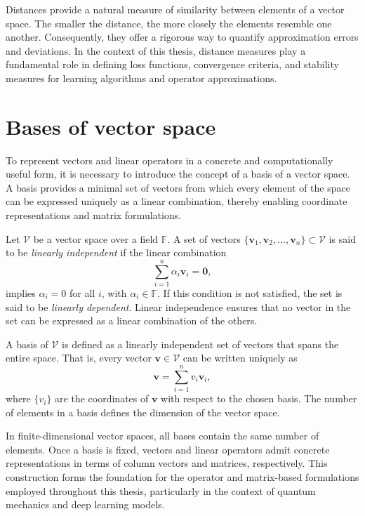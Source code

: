 Distances provide a natural measure of similarity between elements of a vector space. The smaller the distance, the more closely the elements resemble one another. Consequently, they offer a rigorous way to quantify approximation errors and deviations. In the context of this thesis, distance measures play a fundamental role in defining loss functions, convergence criteria, and stability measures for learning algorithms and operator approximations.

\section{Bases of vector space}
\label{sec:basis}

To represent vectors and linear operators in a concrete and computationally useful form, it is necessary to introduce the concept of a basis of a vector space. A basis provides a minimal set of vectors from which every element of the space can be expressed uniquely as a linear combination, thereby enabling coordinate representations and matrix formulations.

Let $\mathcal{V}$ be a vector space over a field $\mathbb{F}$. A set of vectors $\{\mathbf{v}_1, \mathbf{v}_2, \dots, \mathbf{v}_n\} \subset \mathcal{V}$ is said to be \emph{linearly independent} if the linear combination
\begin{equation}
    \sum_{i=1}^{n} \alpha_i \mathbf{v}_i = \mathbf{0},
\end{equation}
implies $\alpha_i = 0$ for all $i$, with $\alpha_i \in \mathbb{F}$. If this condition is not satisfied, the set is said to be \emph{linearly dependent}. Linear independence ensures that no vector in the set can be expressed as a linear combination of the others.

A basis of $\mathcal{V}$ is defined as a linearly independent set of vectors that spans the entire space. That is, every vector $\mathbf{v} \in \mathcal{V}$ can be written uniquely as
\begin{equation}
    \mathbf{v} = \sum_{i=1}^{n} v_i \mathbf{v}_i,
\end{equation}
where $\{v_i\}$ are the coordinates of $\mathbf{v}$ with respect to the chosen basis. The number of elements in a basis defines the dimension of the vector space.

In finite-dimensional vector spaces, all bases contain the same number of elements. Once a basis is fixed, vectors and linear operators admit concrete representations in terms of column vectors and matrices, respectively. This construction forms the foundation for the operator and matrix-based formulations employed throughout this thesis, particularly in the context of quantum mechanics and deep learning models.


